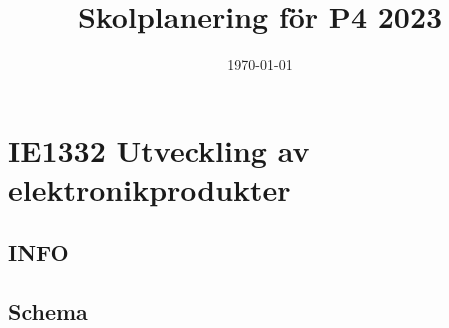 \documentclass[11pt]{article}
\date{\today}
\title{Skolplanering för P4 2023}
\begin{document}
\maketitle
\tableofcontents


\section{IE1332 Utveckling av elektronikprodukter}
\label{sec:orgc4a6517}
\subsection{INFO}
\label{sec:org7ff78f0}

\subsection{Schema}
\label{sec:org4ae69e6}
\end{document}
